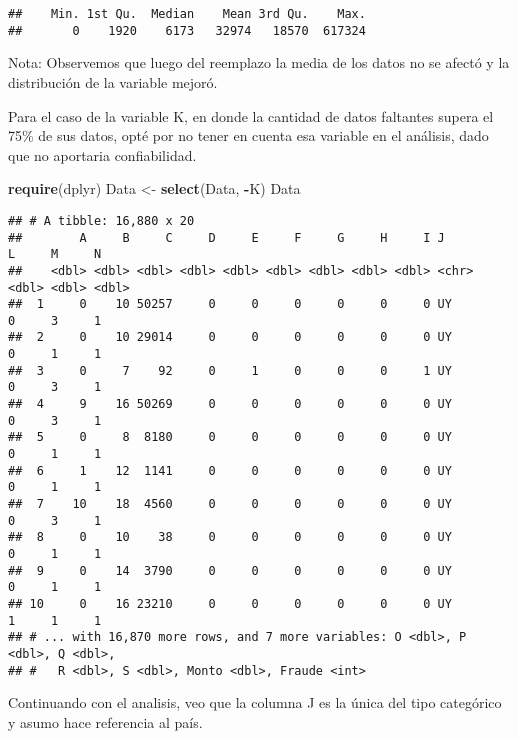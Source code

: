 \documentclass[]{article}
\newenvironment{Shaded}{\begin{snugshade}}{\end{snugshade}}
\newcommand{\KeywordTok}[1]{\textcolor[rgb]{0.13,0.29,0.53}{\textbf{#1}}}
\newcommand{\NormalTok}[1]{#1}
\newcommand{\OperatorTok}[1]{\textcolor[rgb]{0.81,0.36,0.00}{\textbf{#1}}}
\newcommand{\StringTok}[1]{\textcolor[rgb]{0.31,0.60,0.02}{#1}}
\begin{document}
\begin{verbatim}
##    Min. 1st Qu.  Median    Mean 3rd Qu.    Max. 
##       0    1920    6173   32974   18570  617324
\end{verbatim}

Nota: Observemos que luego del reemplazo la media de los datos no se
afectó y la distribución de la variable mejoró.

Para el caso de la variable K, en donde la cantidad de datos faltantes
supera el 75\% de sus datos, opté por no tener en cuenta esa variable en
el análisis, dado que no aportaria confiabilidad.

\begin{Shaded}
\begin{Highlighting}[]
\KeywordTok{require}\NormalTok{(dplyr)}
\NormalTok{Data <-}\StringTok{ }\KeywordTok{select}\NormalTok{(Data, }\OperatorTok{-}\NormalTok{K)}
\NormalTok{Data}
\end{Highlighting}
\end{Shaded}

\begin{verbatim}
## # A tibble: 16,880 x 20
##        A     B     C     D     E     F     G     H     I J         L     M     N
##    <dbl> <dbl> <dbl> <dbl> <dbl> <dbl> <dbl> <dbl> <dbl> <chr> <dbl> <dbl> <dbl>
##  1     0    10 50257     0     0     0     0     0     0 UY        0     3     1
##  2     0    10 29014     0     0     0     0     0     0 UY        0     1     1
##  3     0     7    92     0     1     0     0     0     1 UY        0     3     1
##  4     9    16 50269     0     0     0     0     0     0 UY        0     3     1
##  5     0     8  8180     0     0     0     0     0     0 UY        0     1     1
##  6     1    12  1141     0     0     0     0     0     0 UY        0     1     1
##  7    10    18  4560     0     0     0     0     0     0 UY        0     3     1
##  8     0    10    38     0     0     0     0     0     0 UY        0     1     1
##  9     0    14  3790     0     0     0     0     0     0 UY        0     1     1
## 10     0    16 23210     0     0     0     0     0     0 UY        1     1     1
## # ... with 16,870 more rows, and 7 more variables: O <dbl>, P <dbl>, Q <dbl>,
## #   R <dbl>, S <dbl>, Monto <dbl>, Fraude <int>
\end{verbatim}

Continuando con el analisis, veo que la columna J es la única del tipo
categórico y asumo hace referencia al país.

\begin{Shaded}
\end{Shaded}
\end{document}
